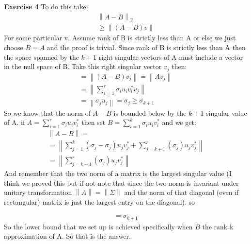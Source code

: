 \documentclass[12pt]{article}
\newcommand{\norm}[1]{\left\lVert#1\right\rVert}
\newenvironment{exercise}[1]{\vspace{.1in}\noindent\textbf{Exercise #1 \hspace{.05em}}}{}
\theoremstyle{definition}
\theoremstyle{remark}
\begin{document}
\begin{exercise}{4}
	To do this take:
	\begin{align}
		\norm{A-B}_2 \\
		\geq \norm{(A-B)v}
	\end{align}
	For some particular v. Assume rank of B is strictly less than A or else we just choose $B=A$ and the proof is trivial. Since rank of B is strictly less than A then the space spanned by the $k+1$ right singular vectors of A must include a vector in the  null space of B. Take this right singular vector $v_j$ then:
	\begin{align}
		=\norm{(A-B)v_j}=\norm{Av_j}              \\
		=\norm{\sum_{i=1}^{r}\sigma_iu_iv_i^*v_j} \\
		=\norm{\sigma_ju_j}=\sigma_j\geq \sigma_{k+1}
	\end{align}
	So we know that the norm of $A-B$ is bounded below by the $k+1$ singular value of A. if $A=\sum_{i=1}^r\sigma_iu_iv_i^*$ then set $B=\sum_{i=1}^k\sigma_iu_iv_i^*$
	and we get:
	\begin{align}
		\norm{A-B}=                                                                                                              \\
		=\norm{\sum\limits_{j=1}^{k}\left(\sigma_j-\sigma_j\right)u_jv_j^*+\sum\limits_{j=k+1}^{r}\left(\sigma_j\right)u_jv_j^*} \\
		=\norm{\sum\limits_{j=k+1}^{r}\left(\sigma_j\right)u_jv_j^*}
	\end{align}
	And remember that the two norm of a matrix is the largest singular value (I think we proved this but if not note that since the two norm is invariant under unitary transformation $\norm{A}=\norm{\Sigma}$ and the norm of that diagonal (even if rectangular) matrix is just the largest entry on the diagonal). so

	\begin{align}
		=\sigma_{k+1}
	\end{align}
	So the lower bound that we set up is achieved specifically when $B$ the rank k approximation of A. So that is the answer.
\end{exercise}
\end{document}
